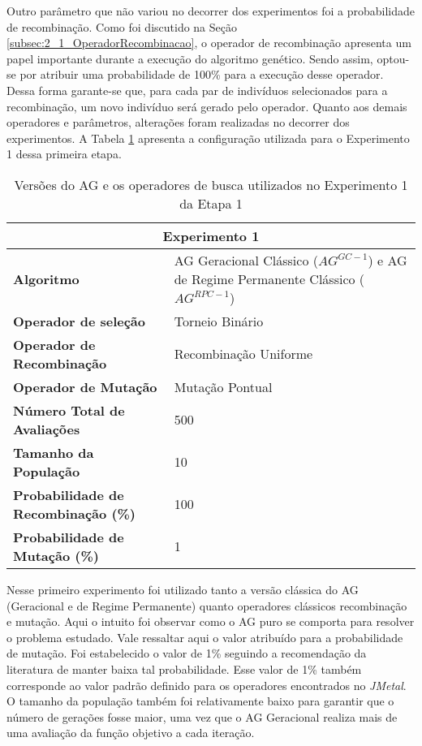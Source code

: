Outro parâmetro que não variou no decorrer dos experimentos foi a probabilidade de recombinação. Como foi discutido na Seção \ref{subsec:2_1_OperadorRecombinacao}, o operador de recombinação apresenta um papel importante durante a execução do algoritmo genético. Sendo assim, optou-se por atribuir uma probabilidade de 100\% para a execução desse operador. Dessa forma garante-se que, para cada par de indivíduos selecionados para a recombinação, um novo indivíduo será gerado pelo operador. Quanto aos demais operadores e parâmetros, alterações foram realizadas no decorrer dos experimentos. A Tabela \ref{table:con01} apresenta a configuração utilizada para o Experimento 1 dessa primeira etapa.

\begin{table}[!htbp]
\centering
\caption{Versões do AG e os operadores de busca utilizados no Experimento 1 da Etapa 1}
\label{table:con01}
\begin{tabular}{|p{6cm}|p{9cm}|}
\hline
\multicolumn{2}{|c|}{\textbf{Experimento 1}} \\ \hline
{\textbf{Algoritmo}} & AG Geracional Clássico ($AG^{GC-1}$) e AG de Regime Permanente Clássico ($AG^{RPC-1}$) \\ \hline
\textbf{Operador de seleção} & Torneio Binário \\ \hline
\textbf{Operador de Recombinação} & Recombinação Uniforme \\  \hline
\textbf{Operador de Mutação} & Mutação Pontual \\ \hline
\textbf{Número Total de Avaliações} & 500 \\ \hline
\textbf{Tamanho da População} & 10 \\ \hline
\textbf{Probabilidade de Recombinação (\%)} & 100 \\ \hline
\textbf{Probabilidade de Mutação (\%)} & 1 \\ \hline
\end{tabular}
\end{table}

Nesse primeiro experimento foi utilizado tanto a versão clássica do AG (Geracional e de Regime Permanente) quanto operadores clássicos recombinação e mutação. Aqui o intuito foi observar como o AG puro se comporta para resolver o problema estudado. Vale ressaltar aqui o valor atribuído para a probabilidade  de mutação. Foi estabelecido o valor de 1\% seguindo a recomendação da literatura de manter baixa tal probabilidade. Esse valor de 1\% também corresponde ao valor padrão definido para os operadores encontrados no \textit{JMetal}. O tamanho da população também foi relativamente baixo para garantir que o número de gerações fosse maior, uma vez que o AG Geracional realiza mais de uma avaliação da função objetivo a cada iteração.


